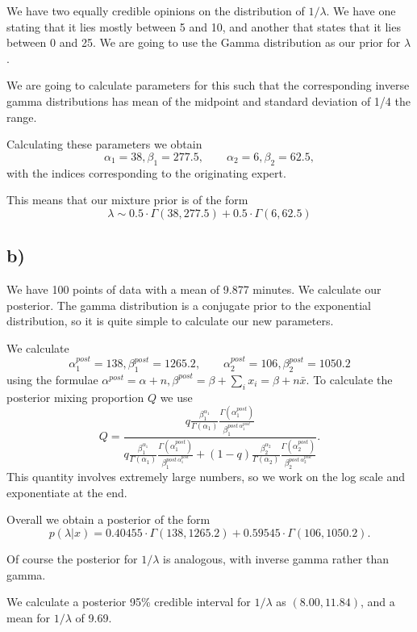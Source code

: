 \documentclass[12pt]{extarticle}
\begin{document}
We have two equally credible opinions on the distribution of $1/\lambda$. We have one stating that it lies mostly between 5 and 10, and another that states that it lies between 0 and 25. We are going to use the Gamma distribution as our prior for $\lambda$. 

We are going to calculate parameters for this such that the corresponding inverse gamma distributions has mean of the midpoint and standard deviation of 1/4 the range. 

Calculating these parameters we obtain 
\[
\alpha_1 = 38, \beta_1 = 277.5, \qquad \alpha_2 = 6, \beta_2 = 62.5,
\]
with the indices corresponding to the originating expert.

This means that our mixture prior is of the form 
\[
\lambda \sim 0.5\cdot\Gamma(38, 277.5) + 0.5\cdot\Gamma(6, 62.5)
\]

\subsection*{b)}

We have 100 points of data with a mean of 9.877 minutes. We calculate our posterior. The gamma distribution is a conjugate prior to the exponential distribution, so it is quite simple to calculate our new parameters. 

We calculate 
\[
\alpha_1^{post} = 138, \beta_1^{post} = 1265.2, \qquad \alpha_2^{post} = 106, \beta_2^{post} = 1050.2
\] using the formulae $\alpha^{post} = \alpha + n, \beta^{post} = \beta + \sum_i x_i = \beta + n\bar{x}.$ To calculate the posterior mixing proportion $Q$ we use \[Q = \frac{q\frac{\beta_1^{\alpha_1}}{\Gamma(\alpha_1)}\frac{\Gamma(\alpha_1^{post})}{\beta_1^{post \ \alpha_1^{post}}}}{q\frac{\beta_1^{\alpha_1}}{\Gamma(\alpha_1)}\frac{\Gamma(\alpha_1^{post})}{\beta_1^{post \ \alpha_1^{post}}} + (1-q)\frac{\beta_2^{\alpha_2}}{\Gamma(\alpha_2)}\frac{\Gamma(\alpha_2^{post})}{\beta_2^{post \ \alpha_2^{post}}}}.\]
This quantity involves extremely large numbers, so we work on the log scale and exponentiate at the end. 

Overall we obtain a posterior of the form
\[
p(\lambda|x) = 0.40455 \cdot \Gamma(138, 1265.2) + 0.59545 \cdot \Gamma(106, 1050.2). 
\]

Of course the posterior for $1/\lambda$ is analogous, with inverse gamma rather than gamma.

We calculate a posterior 95\% credible interval for $1/\lambda$ as $(8.00, 11.84)$, and a mean for $1/\lambda$ of 9.69.
\end{document}
